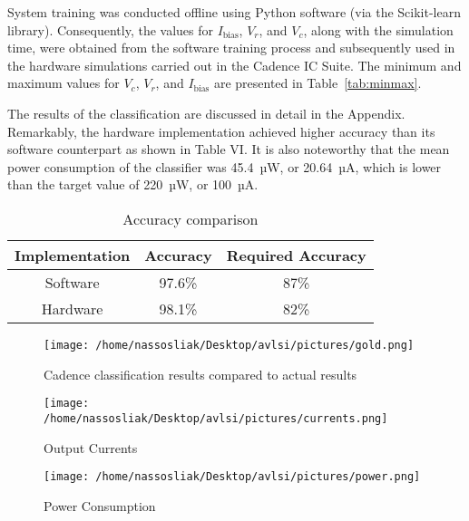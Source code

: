 \documentclass[conference]{IEEEtran}
\begin{document}
System training was conducted offline using Python software (via the Scikit-learn library). Consequently, the values for \(I_{\text{bias}}\), \(V_r\), and \(V_c\), along with the simulation time, were obtained from the software training process and subsequently used in the hardware simulations carried out in the Cadence IC Suite. The minimum and maximum values for \(V_c\), \(V_r\), and \(I_{\text{bias}}\) are presented in Table~\ref{tab:minmax}.

The results of the classification are discussed in detail in the Appendix. Remarkably, the hardware implementation achieved higher accuracy than its software counterpart as shown in Table VI. It is also noteworthy that the mean power consumption of the classifier was 45.4~µW, or 20.64~µA, which is lower than the target value of 220~µW, or 100~µA.

\begin{table}[!h]
    \centering
\large
    \begin{tabular}{|c|c|c|}
        \hline
        \textbf{Implementation} & \textbf{Accuracy} &\textbf{Required Accuracy} \\
        \hline
        Software   &  97.6\% & 87\% \\
        \hline
        Hardware   & 98.1\%  & 82\% \\
        \hline
    \end{tabular}
\vspace{0.5cm}
    \caption{Accuracy comparison}
\end{table}


\begin{figure}[!h]
    \centering
    \texttt{[image: /home/nassosliak/Desktop/avlsi/pictures/gold.png]}
    \caption{Cadence classification results compared to actual results}
    \label{fig:currents}
\end{figure}



\begin{figure}[!h]
    \centering
    \texttt{[image: /home/nassosliak/Desktop/avlsi/pictures/currents.png]}
    \caption{Output Currents}
    \label{fig:currents}
\end{figure}

\begin{figure}[!h]
    \centering
    \texttt{[image: /home/nassosliak/Desktop/avlsi/pictures/power.png]}
    \caption{Power Consumption}
    \label{fig:power}
\end{figure}
\end{document}
